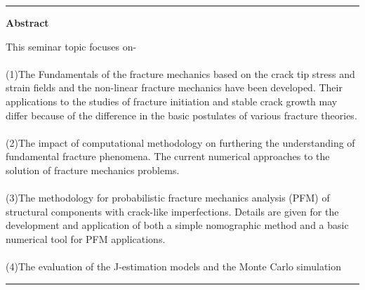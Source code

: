 \documentclass[11pt]{article}
\begin{document}
\rule{\textwidth}{.1em}
\begin{center}
\textbf{Abstract}
\end{center}
    This seminar topic focuses on-
    \\\\(1)The Fundamentals of the fracture mechanics based on the crack tip stress and strain fields and the non-linear fracture mechanics have been developed. Their applications to the studies of fracture initiation and stable crack growth may differ because of the difference in the basic postulates of various fracture theories.
    \\\\(2)The impact of computational methodology on furthering the understanding of fundamental fracture phenomena. The current numerical approaches to the solution of fracture mechanics problems.
    \\\\(3)The methodology for probabilistic fracture mechanics analysis (PFM) of structural components with crack-like imperfections. Details are given for the development and application of both a simple nomographic method and a basic numerical tool for PFM applications.
    \\\\(4)The evaluation of the J-estimation models and the Monte Carlo simulation

    

\rule{\textwidth}{.1em}

\end{document}
